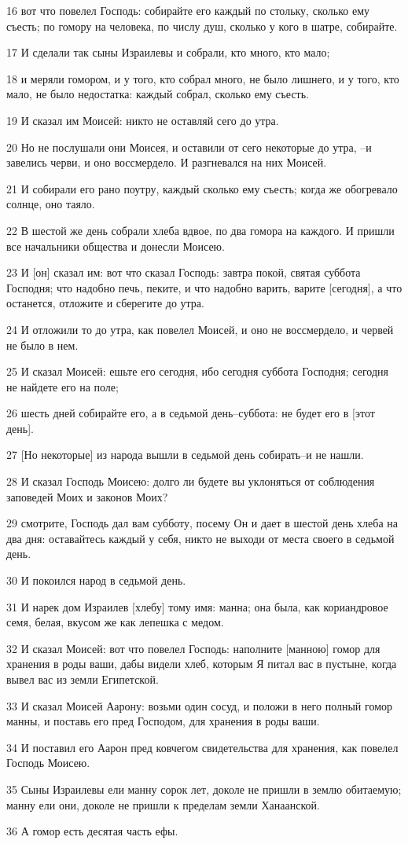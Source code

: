 \par 16 вот что повелел Господь: собирайте его каждый по стольку, сколько ему съесть; по гомору на человека, по числу душ, сколько у кого в шатре, собирайте.
\par 17 И сделали так сыны Израилевы и собрали, кто много, кто мало;
\par 18 и меряли гомором, и у того, кто собрал много, не было лишнего, и у того, кто мало, не было недостатка: каждый собрал, сколько ему съесть.
\par 19 И сказал им Моисей: никто не оставляй сего до утра.
\par 20 Но не послушали они Моисея, и оставили от сего некоторые до утра, --и завелись черви, и оно воссмердело. И разгневался на них Моисей.
\par 21 И собирали его рано поутру, каждый сколько ему съесть; когда же обогревало солнце, оно таяло.
\par 22 В шестой же день собрали хлеба вдвое, по два гомора на каждого. И пришли все начальники общества и донесли Моисею.
\par 23 И [он] сказал им: вот что сказал Господь: завтра покой, святая суббота Господня; что надобно печь, пеките, и что надобно варить, варите [сегодня], а что останется, отложите и сберегите до утра.
\par 24 И отложили то до утра, как повелел Моисей, и оно не воссмердело, и червей не было в нем.
\par 25 И сказал Моисей: ешьте его сегодня, ибо сегодня суббота Господня; сегодня не найдете его на поле;
\par 26 шесть дней собирайте его, а в седьмой день--суббота: не будет его в [этот день].
\par 27 [Но некоторые] из народа вышли в седьмой день собирать--и не нашли.
\par 28 И сказал Господь Моисею: долго ли будете вы уклоняться от соблюдения заповедей Моих и законов Моих?
\par 29 смотрите, Господь дал вам субботу, посему Он и дает в шестой день хлеба на два дня: оставайтесь каждый у себя, никто не выходи от места своего в седьмой день.
\par 30 И покоился народ в седьмой день.
\par 31 И нарек дом Израилев [хлебу] тому имя: манна; она была, как кориандровое семя, белая, вкусом же как лепешка с медом.
\par 32 И сказал Моисей: вот что повелел Господь: наполните [манною] гомор для хранения в роды ваши, дабы видели хлеб, которым Я питал вас в пустыне, когда вывел вас из земли Египетской.
\par 33 И сказал Моисей Аарону: возьми один сосуд, и положи в него полный гомор манны, и поставь его пред Господом, для хранения в роды ваши.
\par 34 И поставил его Аарон пред ковчегом свидетельства для хранения, как повелел Господь Моисею.
\par 35 Сыны Израилевы ели манну сорок лет, доколе не пришли в землю обитаемую; манну ели они, доколе не пришли к пределам земли Ханаанской.
\par 36 А гомор есть десятая часть ефы.

